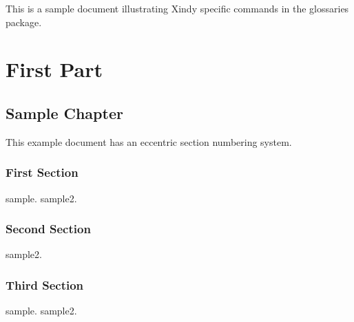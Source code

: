 \documentclass{report}
\begin{document}
This is a sample document illustrating Xindy specific commands in
the glossaries package.

\part{First Part}

\chapter{Sample Chapter}
This example document has an eccentric section numbering system.

\section{First Section}

\gls{sample}. \gls{sample2}.

\section{Second Section}

\gls{sample2}.

\section{Third Section}

\gls{sample}. \gls{sample2}.

\printglossaries
\end{document}
